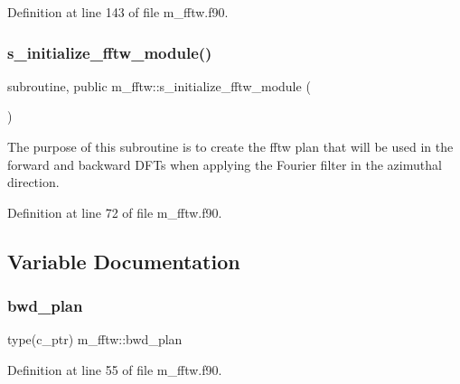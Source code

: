 Definition at line 143 of file m\+\_\+fftw.\+f90.

\mbox{\label{namespacem__fftw_a6f924722e9573d6526d5d1ba173f4ac6}} 
\subsubsection{\texorpdfstring{s\+\_\+initialize\+\_\+fftw\+\_\+module()}{s\_initialize\_fftw\_module()}}
{\footnotesize\ttfamily subroutine, public m\+\_\+fftw\+::s\+\_\+initialize\+\_\+fftw\+\_\+module (\begin{DoxyParamCaption}{ }\end{DoxyParamCaption})}



The purpose of this subroutine is to create the fftw plan that will be used in the forward and backward D\+F\+Ts when applying the Fourier filter in the azimuthal direction. 



Definition at line 72 of file m\+\_\+fftw.\+f90.



\subsection{Variable Documentation}
\mbox{\label{namespacem__fftw_a5120d0924ad190de0c0967cfdfdffb64}} 
\subsubsection{\texorpdfstring{bwd\+\_\+plan}{bwd\_plan}}
{\footnotesize\ttfamily type(c\+\_\+ptr) m\+\_\+fftw\+::bwd\+\_\+plan}



Definition at line 55 of file m\+\_\+fftw.\+f90.

\mbox{\label{namespacem__fftw_afa99ee82497ae0ee316e97734ad0d7d3}} 
